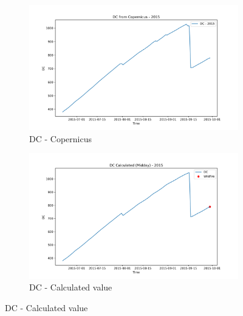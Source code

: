 \begin{figure}[h]
\caption{Comparison of DC calculated values and Copernicus at midday}
    \centering
    \begin{subfigure}{0.49\textwidth}
        \centering
        \includegraphics[width=\textwidth]{graphs/2015/2015CopernicusDC12.png}
        \caption{DC - Copernicus}
        \label{fig:dc_copernicus_2015_midday}
    \end{subfigure}
    \hfill
    \begin{subfigure}{0.49\textwidth}
        \centering
        \includegraphics[width=\textwidth]{graphs/2015/2015CalcDC12.png}
        \caption{DC - Calculated value}
        \label{fig:dc_calculated_2015_midday}
    \end{subfigure}
    \label{fig:comparison_dc_midday_copernicus_calculated}
\end{figure}

